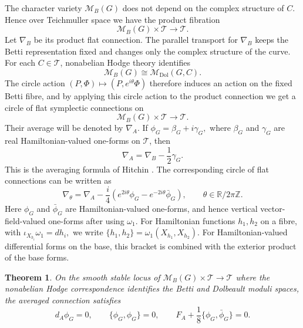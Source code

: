 \documentclass[11pt,reqno]{amsart}
\numberwithin{equation}{section}
\theoremstyle{plain}
\newtheorem{theorem}{Theorem}[section]
\theoremstyle{definition}
\theoremstyle{remark}
\begin{document}
The character variety \(\mathcal M_B(G)\) does not depend on the complex
structure of \(C\). Hence over Teichmuller space we have the product
fibration
\[
        \mathcal M_B(G)\times\mathcal T
        \longrightarrow
        \mathcal T.
\]
Let \(\nabla_B\) be its product flat connection. The parallel transport for
\(\nabla_B\) keeps the Betti representation fixed and changes only the complex
structure of the curve. For each \(C\in\mathcal T\), nonabelian Hodge theory identifies
\[
        \mathcal M_B(G)
        \cong
        \mathcal M_{\mathrm{Dol}}(G,C).
\]
The circle action
\(
        (P,\Phi)\longmapsto(P,e^{i\theta}\Phi)
\)
therefore induces an action on the fixed Betti fibre, and by applying this
circle action to the product connection we get a circle of flat symplectic
connections on
\[
        \mathcal M_B(G)\times\mathcal T
        \longrightarrow
        \mathcal T.
\]
Their average will be denoted by \(\nabla_A\). If
\(
        \phi_G=\beta_G+i\gamma_G,
\)
where \(\beta_G\) and \(\gamma_G\) are real Hamiltonian-valued one-forms on
\(\mathcal T\), then
\[
        \nabla_A=\nabla_B-\frac12\gamma_G .
\]
This is the averaging formula of Hitchin \cite[Sec.~3]{HitchinUniversal}. The corresponding circle of flat connections can be written as
\begin{equation}
        \nabla_\theta
        =
        \nabla_A
        -
        \frac{i}{4}
        \left(
        e^{2i\theta}\phi_G
        -
        e^{-2i\theta}\bar\phi_G
        \right),
        \qquad
        \theta\in\mathbb R/2\pi\mathbb Z.
        \label{eq:theta-connection}
\end{equation}
Here \(\phi_G\) and \(\bar\phi_G\) are Hamiltonian-valued one-forms, and hence
vertical vector-field-valued one-forms after using \(\omega_1\). For Hamiltonian functions \(h_1,h_2\) on a fibre, with
\(
        \iota_{X_{h_i}}\omega_1=dh_i,
\)
we write
\(
        \{h_1,h_2\}
        =
        \omega_1(X_{h_1},X_{h_2}).
\)
For Hamiltonian-valued differential forms on the base, this bracket is combined
with the exterior product of the base forms.

\begin{theorem}
\label{thm:compact-flatness}
On the smooth stable locus of
\(
        \mathcal M_B(G)\times\mathcal T\longrightarrow\mathcal T
\)
where the nonabelian Hodge correspondence identifies the Betti and Dolbeault
moduli spaces, the averaged connection satisfies
\[
        d_A\phi_G=0,
        \qquad
        \{\phi_G,\phi_G\}=0,
        \qquad
        F_A+\frac18\{\phi_G,\bar\phi_G\}=0.
\]
\end{theorem}
\end{document}
